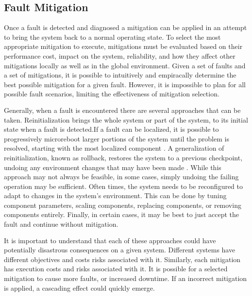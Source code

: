 \subsection{Fault Mitigation}
\label{sub:fault_mitigation}
Once a fault is detected and diagnosed a mitigation can be applied in an
attempt to bring the system back to a normal operating state. To select the
most appropriate mitigation to execute, mitigations must be evaluated based on
their performance cost, impact on the system, reliability, and how they affect
other mitigations locally as well as in the global environment. Given a set of
faults and a set of mitigations, it is possible to intuitively and empiracally
determine the best possible mitigation for a given fault. However, it is
impossible to plan for all possible fault scenarios, limiting the effectiveness
of mitigation selection.

Generally, when a fault is encountered there are several approaches that can be
taken. Reinitialization brings the whole system or part of the system, to its
initial state when a fault is detected.If a fault can be localized, it is
possible to progressively microreboot larger portions of the system until the
problem is resolved, starting with the most localized component
\cite{1251257}. A generalization of reinitialization, known as rollback,
restores the system to a previous checkpoint, undoing any environment changes
that may have been made \cite{1095833}. While this approach may not always be
feasible, in some cases, simply undoing the failing operation may be
sufficient. Often times, the system needs to be reconfigured to adapt to
changes in the system's environment. This can be done by tuning component
parameters, scaling components, replacing components, or removing components
entirely. Finally, in certain cases, it may be best to just accept the fault
and continue without mitigation.

It is important to understand that each of these approaches could have
potentially disastrous consequences on a given system. Different systems have
different objectives and costs risks associated with it. Similarly, each
mitigation has execution costs and risks associated with it. It is possible for
a selected mitigation to cause more faults, or increased downtime. If an
incorrect mitigation is applied, a cascading effect could quickly emerge.



